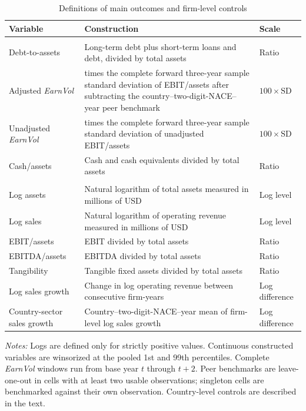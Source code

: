 \begin{table}[H]
\centering
\footnotesize
\caption{Definitions of main outcomes and firm-level controls}
\label{tab:data_variable_definitions}
\setlength{\tabcolsep}{3pt}
\renewcommand{\arraystretch}{1.08}
\begin{tabular}{>{\raggedright\arraybackslash}p{3.3cm}>{\raggedright\arraybackslash}p{9.0cm}>{\raggedright\arraybackslash}p{2.0cm}}
\toprule
Variable & Construction & Scale \\
\midrule
\multicolumn{3}{l}{\textit{Outcomes}} \\
\addlinespace[0.2em]
Debt-to-assets & Long-term debt plus short-term loans and debt, divided by total assets & Ratio \\
\addlinespace[0.35em]
Adjusted \textit{EarnVol} & 100 times the complete forward three-year sample standard deviation of EBIT/assets after subtracting the country--two-digit-NACE--year peer benchmark & $100 \times \mathrm{SD}$ \\
\addlinespace[0.35em]
Unadjusted \textit{EarnVol} & 100 times the complete forward three-year sample standard deviation of unadjusted EBIT/assets & $100 \times \mathrm{SD}$ \\
\addlinespace[0.35em]
Cash/assets & Cash and cash equivalents divided by total assets & Ratio \\
\addlinespace[0.55em]
\multicolumn{3}{l}{\textit{Firm-level controls}} \\
\addlinespace[0.2em]
Log assets & Natural logarithm of total assets measured in millions of USD & Log level \\
\addlinespace[0.35em]
Log sales & Natural logarithm of operating revenue measured in millions of USD & Log level \\
\addlinespace[0.35em]
EBIT/assets & EBIT divided by total assets & Ratio \\
\addlinespace[0.35em]
EBITDA/assets & EBITDA divided by total assets & Ratio \\
\addlinespace[0.35em]
Tangibility & Tangible fixed assets divided by total assets & Ratio \\
\addlinespace[0.35em]
Log sales growth & Change in log operating revenue between consecutive firm-years & Log difference \\
\addlinespace[0.35em]
Country-sector sales growth & Country--two-digit-NACE--year mean of firm-level log sales growth & Log difference \\
\bottomrule
\end{tabular}
\vspace{0.2em}
\begin{minipage}{0.98\textwidth}
\scriptsize
\textit{Notes:} Logs are defined only for strictly positive values. Continuous constructed variables are winsorized at the pooled 1st and 99th percentiles. Complete \textit{EarnVol} windows run from base year $t$ through $t+2$. Peer benchmarks are leave-one-out in cells with at least two usable observations; singleton cells are benchmarked against their own observation. Country-level controls are described in the text.
\end{minipage}
\end{table}

